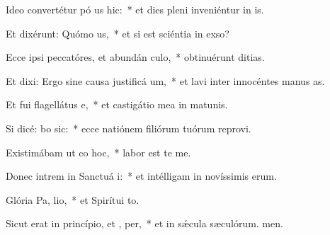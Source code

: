 \item Ideo convertétur pó us hic:~* et dies pleni inveniéntur in is.
\item Et dixérunt: Quómo  us,~* et si est sciéntia in exso?
\item Ecce ipsi peccatóres, et abundán  culo,~* obtinuérunt ditias.
\item Et dixi: Ergo sine causa justificá  um,~* et lavi inter innocéntes manus as.
\item Et fui flagellátus  e,~* et castigátio mea in matunis.
\item Si dicé: bo sic:~* ecce natiónem filiórum tuórum reprovi.
\item Existimábam ut co hoc,~* labor est te me.
\item Donec intrem in Sanctuá i:~* et intélligam in novíssimis erum.
\item Glória Pa,  lio,~* et Spirítui to.
\item Sicut erat in princípio, et ,  per,~* et in sǽcula sæculórum. men.
